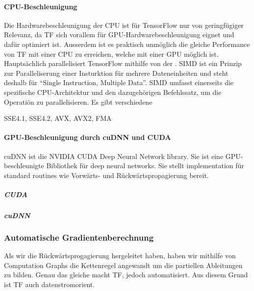\paragraph{CPU-Beschleunigung}
Die Hardwarebeschleunigung der CPU ist für TensorFlow nur von geringfügiger
Relevanz, da TF sich vorallem für GPU-Hardwarebeschleunigung eignet
und dafür optimiert ist. Ausserdem ist es praktisch unmöglich die gleiche
Performance von TF mit einer CPU zu erreichen, welche mit einer GPU möglich ist.
\para{}
Hauptsächlich parallelisiert TensorFlow mithilfe von der . SIMD
ist ein Prinzip zur Paralleliserung einer Insturktion für mehrere
Dateneinheiten und steht deshalb für ``Single Instruction, Multiple Data''.
SIMD umfasst einerseits die spezifische CPU-Architektur und den dazugehörigen
Befehlssatz, um die Operatiön zu parallelisieren.
Es gibt verschiedene

SSE4.1, SSE4.2, AVX, AVX2, FMA

\paragraph{GPU-Beschleunigung durch cuDNN und CUDA}
cuDNN ist die NVIDIA CUDA Deep Neural Network library. Sie ist eine
GPU-beschleunigte Bibliothek für deep neural networks. Sie stellt
implementation für standard routines wie Vorwärts- und Rückwärtspropagierung bereit.

\subparagraph{CUDA}
\subparagraph{cuDNN}


\subsubsection{Automatische Gradientenberechnung}
Als wir die Rückwärtsprogagierung hergeleitet haben, haben wir mithilfe von
Computation Graphs die Kettenregel angewandt um die partiellen Ableitungen zu
bilden. Genau das gleiche macht TF, jedoch automatisiert. Aus diesem Grund ist
TF auch datenstromorient.




